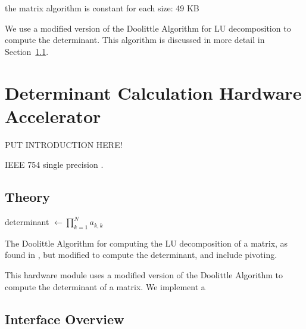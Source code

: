 \documentclass[]{article}
\begin{document}
the matrix algorithm is constant for each size: 49 KB


We use a modified version of the Doolittle Algorithm for LU decomposition to compute the determinant. This algorithm is discussed in more detail in Section~\ref{sub:theory}.







\section{Determinant Calculation Hardware Accelerator} %
\label{sec:determinant_calculation_hardware_accelerator}

PUT INTRODUCTION HERE!

IEEE 754 single precision \cite{ieee754}.

\subsection{Theory} %
\label{sub:theory}

\begin{algorithm}[htbp]
	\SetAlgoLined



	determinant $\leftarrow \prod_{k=1}^N a_{k,k}$
	\bigskip

	\caption{The Doolittle Algorithm for computing the LU decomposition of a matrix, as found in \cite{LUgen}, but modified to compute the determinant, and include pivoting.}
	\label{alg:doolittle}
\end{algorithm}

This hardware module uses a modified version of the Doolittle Algorithm to compute the determinant of a matrix.
We implement a 


\subsection{Interface Overview} %
\label{sub:interface_overview}
\end{document}
